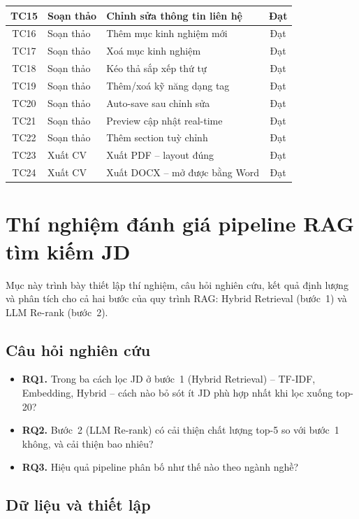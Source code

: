 \documentclass[../DoAn.tex]{subfiles}
\begin{document}
\begin{table}[H]
{\begin{tabular}{|c|l|l|c|}
TC15 & Soạn thảo & Chỉnh sửa thông tin liên hệ & Đạt \\ \hline
TC16 & Soạn thảo & Thêm mục kinh nghiệm mới & Đạt \\ \hline
TC17 & Soạn thảo & Xoá mục kinh nghiệm & Đạt \\ \hline
TC18 & Soạn thảo & Kéo thả sắp xếp thứ tự & Đạt \\ \hline
TC19 & Soạn thảo & Thêm/xoá kỹ năng dạng tag & Đạt \\ \hline
TC20 & Soạn thảo & Auto-save sau chỉnh sửa & Đạt \\ \hline
TC21 & Soạn thảo & Preview cập nhật real-time & Đạt \\ \hline
TC22 & Soạn thảo & Thêm section tuỳ chỉnh & Đạt \\ \hline
TC23 & Xuất CV & Xuất PDF -- layout đúng & Đạt \\ \hline
TC24 & Xuất CV & Xuất DOCX -- mở được bằng Word & Đạt \\ \hline
\end{tabular}%
}
\end{table}

\section{Thí nghiệm đánh giá pipeline RAG tìm kiếm JD}
\label{sec:experiment}

Mục này trình bày thiết lập thí nghiệm, câu hỏi nghiên cứu, kết quả định lượng và phân tích cho cả hai bước của quy trình RAG: Hybrid Retrieval (bước~1) và LLM Re-rank (bước~2).

\subsection{Câu hỏi nghiên cứu}

\begin{itemize}
  \item \textbf{RQ1.} Trong ba cách lọc JD ở bước~1 (Hybrid Retrieval) -- TF-IDF, Embedding, Hybrid -- cách nào bỏ sót ít JD phù hợp nhất khi lọc xuống top-20?
  \item \textbf{RQ2.} Bước~2 (LLM Re-rank) có cải thiện chất lượng top-5 so với bước~1 không, và cải thiện bao nhiêu?
  \item \textbf{RQ3.} Hiệu quả pipeline phân bố như thế nào theo ngành nghề?
\end{itemize}

\subsection{Dữ liệu và thiết lập}
\label{sec:exp_setup}
\end{document}
